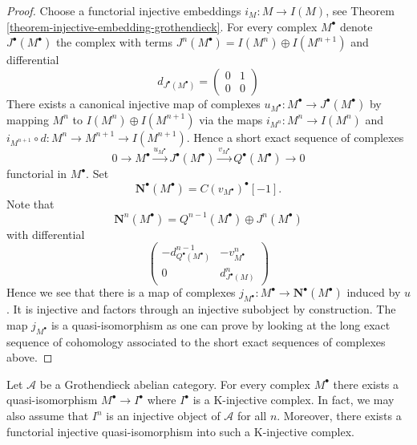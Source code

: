 \begin{proof}
Choose a functorial injective embeddings $i_M : M \to I(M)$, see
Theorem \ref{theorem-injective-embedding-grothendieck}.
For every complex $M^\bullet$ denote $J^\bullet(M^\bullet)$ the complex
with terms $J^n(M^\bullet) = I(M^n) \oplus I(M^{n + 1})$ and differential
$$
d_{J^\bullet(M^\bullet)} =
\left(
\begin{matrix}
0 & 1 \\
0 & 0
\end{matrix}
\right)
$$
There exists a canonical injective map of complexes
$u_{M^\bullet} : M^\bullet \to J^\bullet(M^\bullet)$ by mapping $M^n$ to
$I(M^n) \oplus I(M^{n + 1})$ via the maps $i_{M^n} : M^n \to I(M^n)$ and
$i_{M^{n + 1}} \circ d : M^n \to M^{n + 1} \to I(M^{n + 1})$. Hence a
short exact sequence of complexes
$$
0 \to M^\bullet \xrightarrow{u_{M^\bullet}}
J^\bullet(M^\bullet) \xrightarrow{v_{M^\bullet}}
Q^\bullet(M^\bullet) \to 0
$$
functorial in $M^\bullet$. Set
$$
\mathbf{N}^\bullet(M^\bullet) = C(v_{M^\bullet})^\bullet[-1].
$$
Note that
$$
\mathbf{N}^n(M^\bullet) = Q^{n - 1}(M^\bullet) \oplus J^n(M^\bullet)
$$
with differential
$$
\left(
\begin{matrix}
- d^{n - 1}_{Q^\bullet(M^\bullet)} & - v^n_{M^\bullet} \\
0 & d^n_{J^\bullet(M)}
\end{matrix}
\right)
$$
Hence we see that there is a map of complexes
$j_{M^\bullet} : M^\bullet \to \mathbf{N}^\bullet(M^\bullet)$
induced by $u$. It is injective and factors through an injective subobject
by construction. The map $j_{M^\bullet}$ is a quasi-isomorphism as one
can prove by looking at the long exact sequence of cohomology associated
to the short exact sequences of complexes above.
\end{proof}

\begin{theorem}
\label{theorem-K-injective-embedding-grothendieck}
Let $\mathcal{A}$ be a Grothendieck abelian category.
For every complex $M^\bullet$ there exists a quasi-isomorphism
$M^\bullet \to I^\bullet$ where $I^\bullet$ is a K-injective complex.
In fact, we may also assume that $I^n$ is an injective object of
$\mathcal{A}$ for all $n$. Moreover, there exists a functorial 
injective quasi-isomorphism into such a K-injective complex.
\end{theorem}

